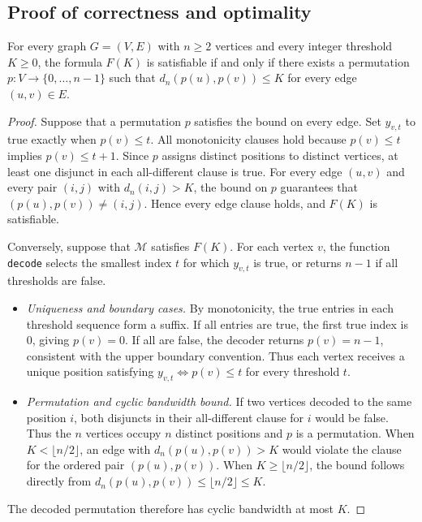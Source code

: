 \subsection{Proof of correctness and optimality}
\begin{cbmptheorem}
For every graph $G=(V,E)$ with $n\ge 2$ vertices and every integer
threshold $K\ge 0$, the formula $F(K)$ is satisfiable if and only if
there exists a permutation $p:V\to\{0,\ldots,n-1\}$ such that
$d_n(p(u),p(v))\le K$ for every edge $(u,v)\in E$.
\end{cbmptheorem}

\begin{proof}
Suppose that a permutation $p$ satisfies the bound on every edge.
Set $y_{v,t}$ to true exactly when $p(v)\le t$. All monotonicity clauses
hold because $p(v)\le t$ implies $p(v)\le t+1$. Since $p$ assigns
distinct positions to distinct vertices, at least one disjunct in each
all-different clause is true. For every edge $(u,v)$ and every pair
$(i,j)$ with $d_n(i,j)>K$, the bound on $p$ guarantees that
$(p(u),p(v))\ne(i,j)$. Hence every edge clause holds, and $F(K)$ is
satisfiable.

Conversely, suppose that $\mathcal{M}$ satisfies $F(K)$. For each vertex
$v$, the function \texttt{decode} selects the smallest index $t$ for
which $y_{v,t}$ is true, or returns $n-1$ if all thresholds are false.
\begin{itemize}
\item \emph{Uniqueness and boundary cases.} By monotonicity, the true
entries in each threshold sequence form a suffix. If all entries are true,
the first true index is $0$, giving $p(v)=0$. If all are false, the
decoder returns $p(v)=n-1$, consistent with the upper boundary
convention. Thus each vertex receives a unique position satisfying
$y_{v,t}\iff p(v)\le t$ for every threshold $t$.
\item \emph{Permutation and cyclic bandwidth bound.} If two vertices
decoded to the same position $i$, both disjuncts in their all-different
clause for $i$ would be false. Thus the $n$ vertices occupy $n$ distinct
positions and $p$ is a permutation. When $K<\lfloor n/2\rfloor$, an edge
with $d_n(p(u),p(v))>K$ would violate the clause for the ordered pair
$(p(u),p(v))$. When $K\ge\lfloor n/2\rfloor$, the bound follows directly
from $d_n(p(u),p(v))\le\lfloor n/2\rfloor\le K$.
\end{itemize}
The decoded permutation therefore has cyclic bandwidth at most $K$.
\end{proof}

